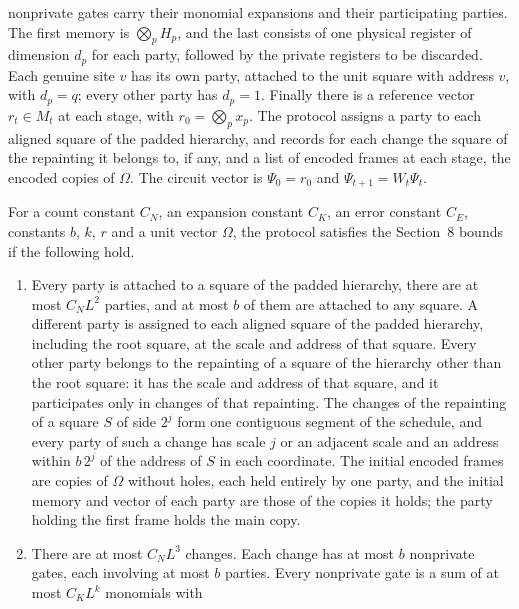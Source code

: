 \begin{definition}
    nonprivate gates carry their monomial expansions and their participating
    parties. The first memory is $\bigotimes_pH_p$, and the last consists of one
    physical register of dimension $d_p$ for each party, followed by the private
    registers to be discarded. Each genuine site $v$ has its own party, attached
    to the unit square with address $v$, with $d_p=q$; every other party has
    $d_p=1$. Finally there is a reference vector $r_t\in M_t$ at each stage, with
    $r_0=\bigotimes_px_p$. The protocol assigns a party to each aligned square of
    the padded hierarchy, and records for each change the square of the
    repainting it belongs to, if any, and a list of encoded frames at each stage,
    the encoded copies of $\Omega$. The circuit vector is
    $\Psi_0=r_0$ and
    $\Psi_{t+1}=W_t\Psi_t$.

    For a count constant $C_N$, an expansion constant $C_K$, an error constant
    $C_E$, constants $b$, $k$, $r$ and a unit vector $\Omega$, the protocol
    satisfies the Section~8 bounds if the following hold.
    \begin{enumerate}
        \item Every party is attached to a square of the padded hierarchy,
              there are at most $C_NL^2$ parties, and at most $b$ of them are
              attached to any square. A different party is assigned to each
              aligned square of the padded hierarchy, including the root
              square, at the scale and address of that square. Every other
              party belongs to the repainting of a square of the hierarchy
              other than the root square: it has the scale and address of
              that square, and it participates only in changes of that
              repainting. The changes of the repainting of a square $S$ of
              side $2^j$ form one contiguous segment of the schedule, and
              every party of such a change has scale $j$ or an adjacent
              scale and an address within $b\,2^j$ of the address of $S$ in
              each coordinate. The initial encoded frames are copies of
              $\Omega$ without holes, each held entirely by one party, and
              the initial memory and vector of each party are those of the
              copies it holds; the party holding the first frame holds the
              main copy.
        \item There are at most $C_NL^3$ changes. Each change has at most $b$
              nonprivate gates, each involving at most $b$ parties. Every
              nonprivate gate is a sum of at most $C_KL^k$ monomials with

\end{enumerate}
\end{definition}
